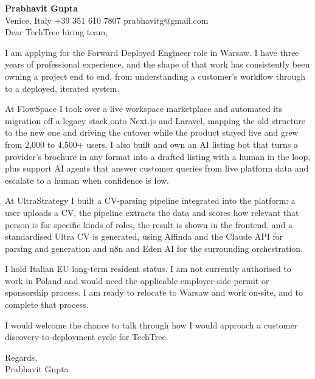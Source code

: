 \documentclass[a4paper,10.5pt]{article}
\begin{document}
\textbf{Prabhavit Gupta}\\
Venice, Italy \textbar{} +39 351 610 7807 \textbar{} prabhavitg@gmail.com\\[10pt]
Dear TechTree hiring team,

I am applying for the Forward Deployed Engineer role in Warsaw. I have three years of professional experience, and the shape of that work has consistently been owning a project end to end, from understanding a customer's workflow through to a deployed, iterated system.

At FlowSpace I took over a live workspace marketplace and automated its migration off a legacy stack onto Next.js and Laravel, mapping the old structure to the new one and driving the cutover while the product stayed live and grew from 2,000 to 4,500+ users. I also built and own an AI listing bot that turns a provider's brochure in any format into a drafted listing with a human in the loop, plus support AI agents that answer customer queries from live platform data and escalate to a human when confidence is low.

At UltraStrategy I built a CV-parsing pipeline integrated into the platform: a user uploads a CV, the pipeline extracts the data and scores how relevant that person is for specific kinds of roles, the result is shown in the frontend, and a standardised Ultra CV is generated, using Affinda and the Claude API for parsing and generation and n8n and Eden AI for the surrounding orchestration.

I hold Italian EU long-term resident status. I am not currently authorised to work in Poland and would need the applicable employer-side permit or sponsorship process. I am ready to relocate to Warsaw and work on-site, and to complete that process.

I would welcome the chance to talk through how I would approach a customer discovery-to-deployment cycle for TechTree.

Regards,\\
Prabhavit Gupta
\end{document}
